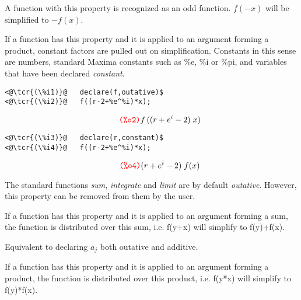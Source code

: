 \documentclass[../Maxima_Workbook.tex]{subfiles}
\begin{document}
\lzz {} \hfill \tcr{[property]}

\lz A function with this property is recognized as an odd function. $ f(-x) $ will be simplified to $ -f(x) $.

\lzz {} \hfill \tcr{[property]}

\lz If a function has this property and it is applied to an argument forming a product, constant factors are pulled out on simplification. Constants in this sense are numbers, standard Maxima constants such as \%e, \%i or \%pi, and variables that have been declared \emph{constant}.

\lz \begin{lstlisting}
<@\tcr{(\%i1)}@   declare(f,outative)$
<@\tcr{(\%i2)}@   f((r-2+%e^%i)*x);
\end{lstlisting} 
\vspace{-6mm} \begin{small}
\color{blue} \leqn
\[ \tag*{\tcr{\ttfamily (\%o2)}} f \, ((r+e^{i}-2) \; x) \]
\vspace{-10.5mm} \begin{lstlisting}
<@\tcr{(\%i3)}@   declare(r,constant)$
<@\tcr{(\%i4)}@   f((r-2+%e^%i)*x);
\end{lstlisting} 
\vspace{-4mm} \[ \tag*{\tcr{\ttfamily (\%o4)}} (r+e^{i}-2) \; f(x) \]
\color{black}  \reqn
\end{small}
\vspace{-4mm}

The standard functions \emph{sum}, \emph{integrate} and \emph{limit} are by default \emph{outative}. However, this property can be removed from them by the user.

\lzz {} \hfill \tcr{[property]}

\lz If a function has this property and it is applied to an argument forming a sum, the function is distributed over this sum, i.e. f(y+x) will simplify to f(y)+f(x). 

\lzz {} \hfill \tcr{[property]}

\lz Equivalent to declaring $ a_j $ both outative and additive.

\lzz {} \hfill \tcr{[property]}

\lz If a function has this property and it is applied to an argument forming a product, the function is distributed over this product, i.e. f(y*x) will simplify to f(y)*f(x). 
\end{document}
